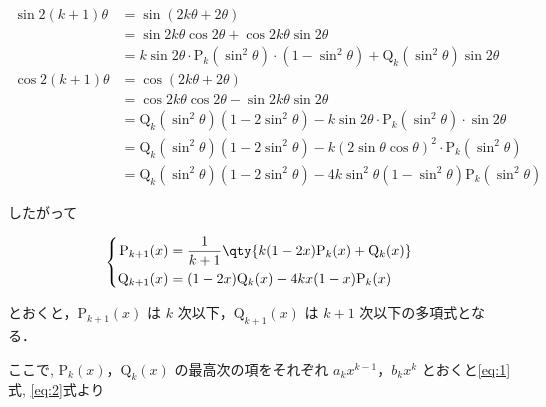 \documentclass[a4paper]{ltjsarticle}
\begin{document}
\begin{enumerate}[label=(\arabic*)]
\begin{enumerate}[label=(\Roman*)]
                    \begin{align*}
                        \sin 2(k+1)\theta & =\sin(2k\theta+2\theta)                                                                                   \\
                                          & =\sin{2k\theta}\cos 2\theta+\cos{2k\theta}\sin2\theta                                                     \\
                                          & =k\sin{2\theta}\cdot\mathrm{P}_k(\sin^2\theta)\cdot(1-\sin^2\theta)+\mathrm{Q}_k(\sin^2\theta)\sin2\theta \\
                        \cos 2(k+1)\theta & =\cos(2k\theta+2\theta)                                                                                   \\
                                          & =\cos{2k\theta}\cos2\theta-\sin{2k\theta}\sin2\theta                                                      \\
                                          & =\mathrm{Q}_k(\sin^2\theta)(1-2\sin^2\theta)-k\sin 2\theta\cdot\mathrm{P}_k(\sin^2\theta)\cdot\sin2\theta \\
                                          & =\mathrm{Q}_k(\sin^2\theta)(1-2\sin^2\theta)-k(2\sin\theta\cos\theta)^2\cdot\mathrm{P}_k(\sin^2\theta)    \\
                                          & =\mathrm{Q}_k(\sin^2\theta)(1-2\sin^2\theta)-4k\sin^2\theta(1-\sin^2\theta)\mathrm{P}_k(\sin^2\theta)
                    \end{align*}

                    したがって

                    \begin{equation*}
                        \left\{\begin{aligned}
                            \mathrm{P}_{k+1}(x) & =\frac{1}{k+1}\qty{k(1-2x)\mathrm{P}_k(x)+\mathrm{Q}_k(x)} \\
                            \mathrm{Q}_{k+1}(x) & =(1-2x)\mathrm{Q}_k(x)-4kx(1-x)\mathrm{P}_k(x)
                        \end{aligned}\right.
                    \end{equation*}

                    とおくと，$\mathrm{P}_{k+1}(x)$ は $k$ 次以下，$\mathrm{Q}_{k+1}(x)$ は $k+1$ 次以下の多項式となる．

                    ここで, $\mathrm{P}_k(x)$，$\mathrm{Q}_k(x)$ の最高次の項をそれぞれ $a_{k}x^{k-1}$，$b_{k}x^k$ とおくと\eqref{eq:1}式, \eqref{eq:2}式より


\end{enumerate}
\end{enumerate}
\end{document}
